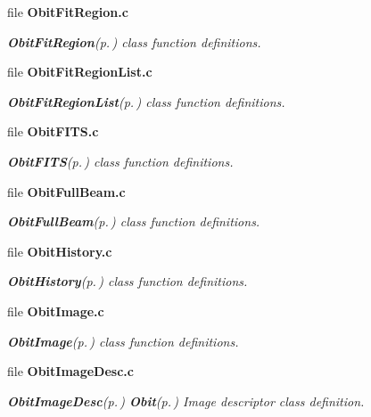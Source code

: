 \begin{CompactItemize}
\item 
file {\bf Obit\-Fit\-Region.c}
\begin{CompactList}\small\item\em {\bf Obit\-Fit\-Region}{\rm (p.\,\pageref{structObitFitRegion})} class function definitions. \item\end{CompactList}

\item 
file {\bf Obit\-Fit\-Region\-List.c}
\begin{CompactList}\small\item\em {\bf Obit\-Fit\-Region\-List}{\rm (p.\,\pageref{structObitFitRegionList})} class function definitions. \item\end{CompactList}

\item 
file {\bf Obit\-FITS.c}
\begin{CompactList}\small\item\em {\bf Obit\-FITS}{\rm (p.\,\pageref{structObitFITS})} class function definitions. \item\end{CompactList}

\item 
file {\bf Obit\-Full\-Beam.c}
\begin{CompactList}\small\item\em {\bf Obit\-Full\-Beam}{\rm (p.\,\pageref{structObitFullBeam})} class function definitions. \item\end{CompactList}

\item 
file {\bf Obit\-History.c}
\begin{CompactList}\small\item\em {\bf Obit\-History}{\rm (p.\,\pageref{structObitHistory})} class function definitions. \item\end{CompactList}

\item 
file {\bf Obit\-Image.c}
\begin{CompactList}\small\item\em {\bf Obit\-Image}{\rm (p.\,\pageref{structObitImage})} class function definitions. \item\end{CompactList}

\item 
file {\bf Obit\-Image\-Desc.c}
\begin{CompactList}\small\item\em {\bf Obit\-Image\-Desc}{\rm (p.\,\pageref{structObitImageDesc})} {\bf Obit}{\rm (p.\,\pageref{structObit})} Image descriptor class definition. \item\end{CompactList}


\end{CompactItemize}
